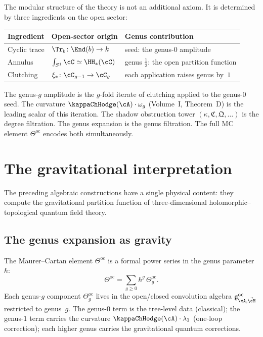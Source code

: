 \begin{principle}[Modularity $=$ trace $+$ clutching]
\label{princ:modularity-v2}
The modular structure of the theory is not an additional axiom.
It is determined by three ingredients on the open sector:
\begin{center}
\renewcommand{\arraystretch}{1.3}
\begin{tabular}{lll}
\textbf{Ingredient} & \textbf{Open-sector origin}
 & \textbf{Genus contribution} \\
\hline
Cyclic trace & $\Tr_b \colon \End(b) \to k$
 & seed: the genus-$0$ amplitude \\
Annulus & $\int_{S^1} \cC \simeq \HH_*(\cC)$
 & genus $\frac{1}{2}$: the open partition function \\
Clutching & $\xi_* \colon \cC_{g-1} \to \cC_g$
 & each application raises genus by~$1$ \\
\end{tabular}
\end{center}
The genus-$g$ amplitude is the $g$-fold iterate of clutching
applied to the genus-$0$ seed. The curvature
$\kappaChHodge(\cA) \cdot \omega_g$ (Volume~I, Theorem~D) is the leading
scalar of this iteration. The shadow obstruction tower
$(\kappa, \mathfrak{C}, \mathfrak{Q}, \ldots)$ is the degree
filtration. The genus expansion is the genus filtration. The full
MC element $\Theta^{\mathrm{oc}}$ encodes both simultaneously.
\end{principle}

\section{The gravitational interpretation}
\label{sec:gravitational-interpretation}

The preceding algebraic constructions have a single physical
content: they compute the gravitational partition function of
three-dimensional holomorphic--topological quantum field theory.

\subsection{The genus expansion as gravity}

The Maurer--Cartan element $\Theta^{\mathrm{oc}}$ is a formal
power series in the genus parameter~$\hbar$:
\[
 \Theta^{\mathrm{oc}}
 = \sum_{g \ge 0} \hbar^g \,\Theta^{\mathrm{oc}}_g.
\]
Each genus-$g$ component $\Theta^{\mathrm{oc}}_g$ lives in the
open/closed convolution algebra
$\mathfrak{g}^{\mathrm{oc}}_{\cA, \vec{\cM}}$
restricted to genus~$g$. The genus-$0$ term is the tree-level
data (classical); the genus-$1$ term carries the curvature
$\kappaChHodge(\cA) \cdot \lambda_1$ (one-loop correction); each higher
genus carries the gravitational quantum corrections.

